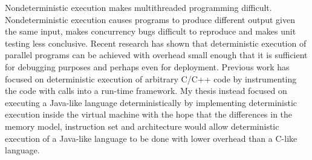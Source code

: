 \begin{abstractpage}
  Nondeterministic execution makes multithreaded programming
  difficult.  Nondeterministic execution causes programs to produce
  different output given the same input, makes concurrency bugs
  difficult to reproduce and makes unit testing less conclusive.
  Recent research has shown that deterministic execution of parallel
  programs can be achieved with overhead small enough that it is
  sufficient for debugging purposes and perhaps even for deployment.
  Previous work has focused on deterministic execution of arbitrary
  C/C++ code by instrumenting the code with calls into a run-time
  framework.  My thesis instead focused on executing a Java-like
  language deterministically by implementing deterministic execution
  inside the virtual machine with the hope that the differences in the
  memory model, instruction set and architecture would allow
  deterministic execution of a Java-like language to be done with
  lower overhead than a C-like language.
\end{abstractpage}

